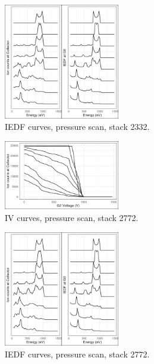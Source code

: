 \begin{figure}[htbp]
\centering
\includegraphics[width=0.45\textwidth]{Figures/PressureScan2332.jpeg}
\caption{IEDF curves, pressure scan, stack 2332.}
\label{fig:PressureScan2332}
\end{figure}

\begin{figure}[htbp]
\centering
\includegraphics[width=0.45\textwidth]{Figures/IVcurve2772.jpeg}
\caption{IV curves, pressure scan, stack 2772.}
\label{fig:IVcurves2772}
\end{figure}

\begin{figure}[htbp]
\centering
\includegraphics[width=0.45\textwidth]{Figures/PressureScan2772.jpeg}
\caption{IEDF curves, pressure scan, stack 2772.}
\label{fig:PressureScan2772}
\end{figure}
